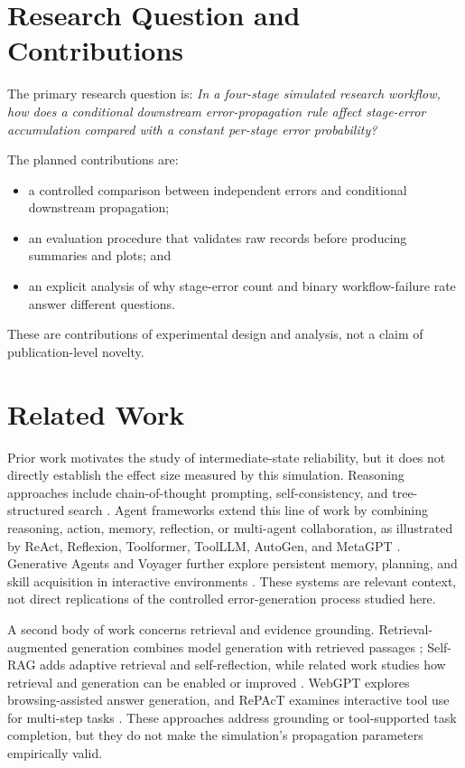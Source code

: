 \documentclass[conference]{IEEEtran}
\begin{document}
\section{Research Question and Contributions}
The primary research question is: \emph{In a four-stage simulated research workflow, how does a conditional downstream error-propagation rule affect stage-error accumulation compared with a constant per-stage error probability?}

The planned contributions are:
\begin{itemize}
  \item a controlled comparison between independent errors and conditional downstream propagation;
  \item an evaluation procedure that validates raw records before producing summaries and plots; and
  \item an explicit analysis of why stage-error count and binary workflow-failure rate answer different questions.
\end{itemize}
These are contributions of experimental design and analysis, not a claim of publication-level novelty.

\section{Related Work}
Prior work motivates the study of intermediate-state reliability, but it does not directly establish the effect size measured by this simulation. Reasoning approaches include chain-of-thought prompting, self-consistency, and tree-structured search \cite{wei2022cot,wang2023selfconsistency,yao2023tot}. Agent frameworks extend this line of work by combining reasoning, action, memory, reflection, or multi-agent collaboration, as illustrated by ReAct, Reflexion, Toolformer, ToolLLM, AutoGen, and MetaGPT \cite{yao2023react,shinn2023reflexion,schick2023toolformer,qin2024toolllm,wu2024autogen,hong2024metagpt}. Generative Agents and Voyager further explore persistent memory, planning, and skill acquisition in interactive environments \cite{park2023generative,wang2023voyager}. These systems are relevant context, not direct replications of the controlled error-generation process studied here.

A second body of work concerns retrieval and evidence grounding. Retrieval-augmented generation combines model generation with retrieved passages \cite{lewis2020rag}; Self-RAG adds adaptive retrieval and self-reflection, while related work studies how retrieval and generation can be enabled or improved \cite{asai2024selfrag,gao2023enabling}. WebGPT explores browsing-assisted answer generation, and RePAcT examines interactive tool use for multi-step tasks \cite{nakano2021webgpt,dongre2025respact}. These approaches address grounding or tool-supported task completion, but they do not make the simulation's propagation parameters empirically valid.
\end{document}
